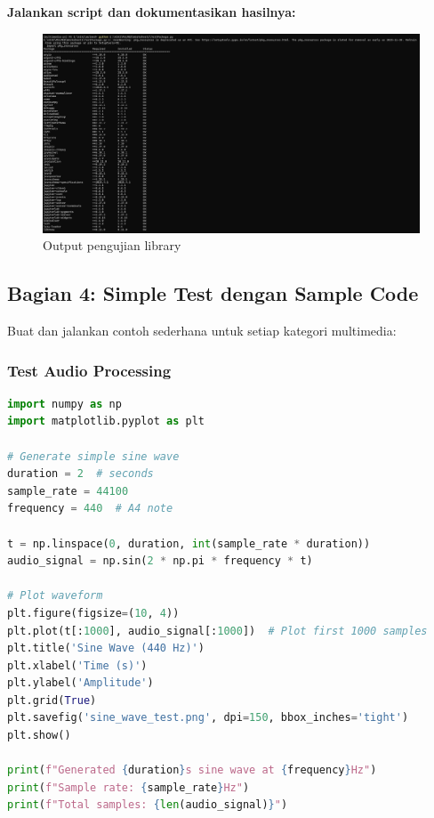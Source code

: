 \documentclass[11pt,a4paper]{article}
\begin{document}
\textbf{Jalankan script dan dokumentasikan hasilnya:}
    \begin{figure}[h!]
        \centering
        \includegraphics[scale = 0.33]{Figure/TestPackage.png}
        \caption{Output pengujian library} 
        \vspace{0.1cm}
    \end{figure}


\subsection{Bagian 4: Simple Test dengan Sample Code}
Buat dan jalankan contoh sederhana untuk setiap kategori multimedia:

\subsubsection{Test Audio Processing}
\begin{lstlisting}[language=Python, caption=Test audio processing sederhana]
import numpy as np
import matplotlib.pyplot as plt

# Generate simple sine wave
duration = 2  # seconds
sample_rate = 44100
frequency = 440  # A4 note

t = np.linspace(0, duration, int(sample_rate * duration))
audio_signal = np.sin(2 * np.pi * frequency * t)

# Plot waveform
plt.figure(figsize=(10, 4))
plt.plot(t[:1000], audio_signal[:1000])  # Plot first 1000 samples
plt.title('Sine Wave (440 Hz)')
plt.xlabel('Time (s)')
plt.ylabel('Amplitude')
plt.grid(True)
plt.savefig('sine_wave_test.png', dpi=150, bbox_inches='tight')
plt.show()

print(f"Generated {duration}s sine wave at {frequency}Hz")
print(f"Sample rate: {sample_rate}Hz")
print(f"Total samples: {len(audio_signal)}")
\end{lstlisting}
\end{document}
